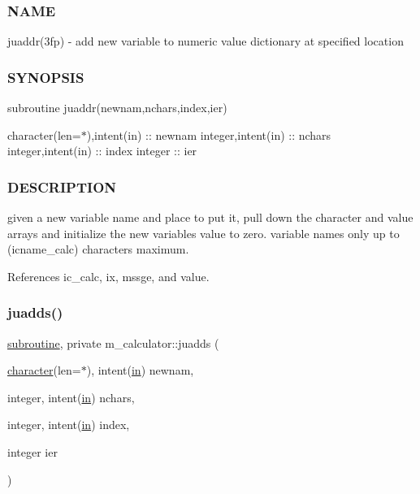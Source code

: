 \subsubsection*{N\+A\+ME}

juaddr(3fp) -\/ add new variable to numeric value dictionary at specified location 

\subsubsection*{S\+Y\+N\+O\+P\+S\+IS}

subroutine juaddr(newnam,nchars,index,ier)

character(len=$\ast$),intent(in) \+:\+: newnam integer,intent(in) \+:\+: nchars integer,intent(in) \+:\+: index integer \+:\+: ier

\subsubsection*{D\+E\+S\+C\+R\+I\+P\+T\+I\+ON}

given a new variable name and place to put it, pull down the character and value arrays and initialize the new variable\textquotesingle{}s value to zero. variable names only up to (icname\+\_\+calc) characters maximum. 

References ic\+\_\+calc, ix, mssge, and value.

\mbox{\label{namespacem__calculator_a6d54137f485f8d2ed239b58e44cdb732}} 
\subsubsection{\texorpdfstring{juadds()}{juadds()}}
{\footnotesize\ttfamily \hyperlink{M__stopwatch_83_8txt_acfbcff50169d691ff02d4a123ed70482}{subroutine}, private m\+\_\+calculator\+::juadds (\begin{DoxyParamCaption}\item[{\hyperlink{option__stopwatch_83_8txt_abd4b21fbbd175834027b5224bfe97e66}{character}(len=$\ast$), intent(\hyperlink{M__journal_83_8txt_afce72651d1eed785a2132bee863b2f38}{in})}]{newnam,  }\item[{integer, intent(\hyperlink{M__journal_83_8txt_afce72651d1eed785a2132bee863b2f38}{in})}]{nchars,  }\item[{integer, intent(\hyperlink{M__journal_83_8txt_afce72651d1eed785a2132bee863b2f38}{in})}]{index,  }\item[{integer}]{ier }\end{DoxyParamCaption})\hspace{0.3cm}{\ttfamily [private]}}



